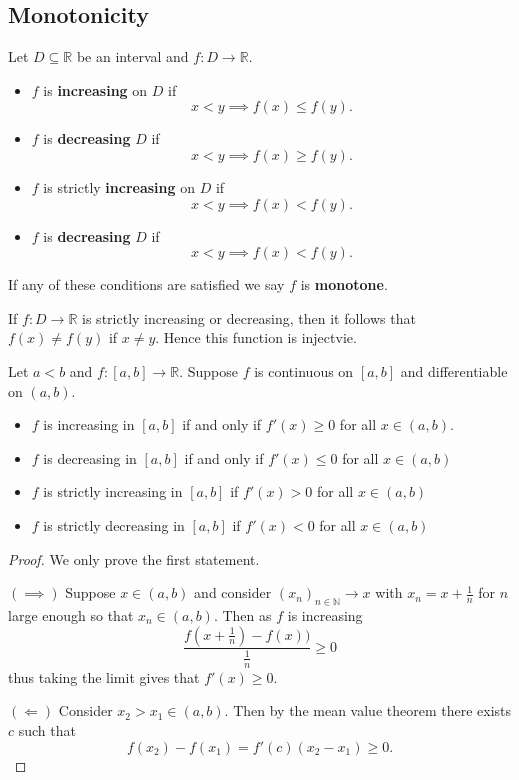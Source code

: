 \subsection{Monotonicity}

\begin{definition}
    Let $D \subseteq \mathbb{R}$ be an interval and $f : D \rightarrow \mathbb{R}$.
    \begin{itemize}
    \item $f$ is {\bf increasing} on $D$ if
        \[x < y \implies f(x) \leq f(y).\]
      \item $f$ is {\bf decreasing} $D$ if
        \[x < y \implies f(x) \geq f(y).\]
    \item $f$ is {strictly \bf increasing} on $D$ if
        \[x < y \implies f(x) < f(y).\]
      \item $f$ is {\bf decreasing} $D$ if
        \[x < y \implies f(x) < f(y).\]
    \end{itemize}
    If any of these conditions are satisfied we say $f$ is {\bf monotone}.
\end{definition}

\begin{remark}
    If $f: D \rightarrow \mathbb{R}$ is strictly increasing or decreasing, then it follows that $f(x) \not = f(y)$ if $x \not = y$. Hence this function is injectvie.
\end{remark}

\begin{theorem}
  Let $a < b$ and $f:[a,b] \rightarrow \mathbb{R}$. Suppose $f$ is continuous on $[a,b]$ and differentiable on $(a,b)$.
  \begin{itemize}
    \item $f$ is increasing in $[a,b]$ if and only if $f'(x) \geq 0$ for all $x \in (a,b)$.
    \item $f$ is decreasing in $[a,b]$ if and only if $f'(x) \leq 0$ for all $x \in (a,b)$
    \item $f$ is strictly increasing in $[a,b]$ if $f'(x) > 0$ for all $x \in (a,b)$
    \item $f$ is strictly decreasing in $[a,b]$ if $f'(x) < 0$ for all $x \in (a,b)$

  \end{itemize}
\end{theorem}
\begin{proof}
  We only prove the first statement.

  \noindent $(\implies)$ Suppose $x \in (a,b)$ and consider $(x_n)_{n \in \mathbb{N}} \rightarrow x$ with $x_n = x + \frac{1}{n}$ for $n$ large enough so that $x_n \in (a,b)$. Then as $f$ is increasing
  \[\frac{f(x + \frac{1}{n}) - f(x))}{\frac{1}{n}} \geq 0\]
  thus taking the limit gives that $f'(x) \geq 0$.

  \noindent $(\Leftarrow)$ Consider $x_2 > x_1 \in (a,b)$. Then by the mean value theorem there exists $c$ such that
  \[f(x_2) - f(x_1) = f'(c)(x_2 - x_1) \geq 0.\]
\end{proof}


